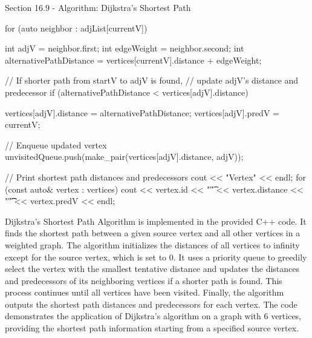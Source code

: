 \begin{notes}{Section 16.9 - Algorithm: Dijkstra's Shortest Path}
\begin{highlight}
\begin{code}[C++]
{{            for (auto neighbor : adjList[currentV]) {
                int adjV = neighbor.first;
                int edgeWeight = neighbor.second;
                int alternativePathDistance = vertices[currentV].distance + edgeWeight;
    
                // If shorter path from startV to adjV is found,
                // update adjV's distance and predecessor
                if (alternativePathDistance < vertices[adjV].distance) {
                    vertices[adjV].distance = alternativePathDistance;
                    vertices[adjV].predV = currentV;
    
                    // Enqueue updated vertex
                    unvisitedQueue.push(make_pair(vertices[adjV].distance, adjV));
                }
            }
        }
    
        // Print shortest path distances and predecessors
        cout << "Vertex\tDistance\tPredecessor" << endl;
        for (const auto& vertex : vertices) {
            cout << vertex.id << "\t" << vertex.distance << "\t\t" 
                << vertex.predV << endl;
        }
    }
    \end{code}
        Dijkstra's Shortest Path Algorithm is implemented in the provided C++ code. It finds the shortest path between a given source vertex and all other vertices in a weighted graph. The algorithm initializes the distances of all 
        vertices to infinity except for the source vertex, which is set to 0. It uses a priority queue to greedily select the vertex with the smallest tentative distance and updates the distances and predecessors of its neighboring 
        vertices if a shorter path is found. This process continues until all vertices have been visited. Finally, the algorithm outputs the shortest path distances and predecessors for each vertex. The code demonstrates the application 
        of Dijkstra's algorithm on a graph with 6 vertices, providing the shortest path information starting from a specified source vertex.
    \end{highlight}
\end{notes}

